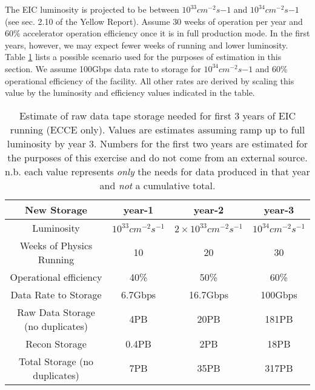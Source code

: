 


The EIC luminosity is projected to be between $10^{33}cm^{-2}s{-1}$ and $10^{34}cm^{-2}s{-1}$ (see sec. 2.10 of the Yellow Report\cite{eic_yellow_report_v1_1}). Assume 30 weeks of operation per year and 60\% accelerator operation efficiency once it is in full production mode. In the first years, however, we may expect fewer weeks of running and lower luminosity. Table \ref{tab:integrated_luminosity_by_year} lists a possible scenario used for the purposes of estimation in this section. We assume 100Gbps data rate to storage for $10^{34}cm^{-2}s{-1}$ and 60\% operational efficiency of the facility. All other rates are derived by scaling this value by the luminosity and efficiency values indicated in the table.


\begin{table}[htb!]
    \centering
    \begin{tabular}{c|c|c|c}
        \hline
        \hline
         \textbf{New Storage}       & year-1                & year-2                  & year-3                \\
        \hline
         Luminosity              & $10^{33}cm^{-2}s^{-1}$ & $2\times10^{33}cm^{-2}s^{-1}$ & $10^{34}cm^{-2}s^{-1}$ \\
         \hline
         Weeks of Physics Running        & 10                    & 20                      & 30                    \\
         \hline
         Operational efficiency    & 40\%                  & 50\%                    & 60\%                  \\
         \hline
         Data Rate to Storage    & 6.7Gbps               & 16.7Gbps                & 100Gbps               \\
         \hline
         Raw Data Storage (no duplicates) & 4PB          & 20PB                    & 181PB                 \\
         \hline
         Recon Storage          & 0.4PB                  & 2PB                    & 18PB                   \\ %
         \hline
         Total Storage (no duplicates) & 7PB           & 35PB                   & 317PB                  \\
         \hline
   \end{tabular}
    \caption{Estimate of raw data tape storage needed for first 3 years of EIC running (ECCE only). Values are estimates assuming ramp up to full luminosity  by year 3. Numbers for the first two years are estimated for the purposes of this exercise and do not come from an external source. n.b. each value represents \emph{only} the needs for data produced in that year and \emph{not} a cumulative total.}
    \label{tab:integrated_luminosity_by_year}
\end{table}

